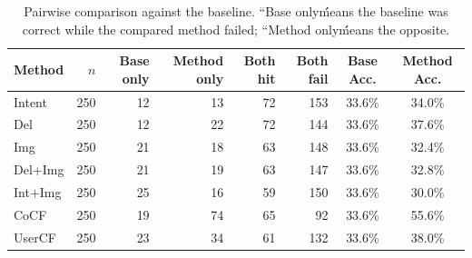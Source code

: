 \FloatBarrier



\begin{table}[t]
\centering
\small
\caption{Pairwise comparison against the baseline. ``Base only\'\' means the baseline was correct while the compared method failed; ``Method only\'\' means the opposite.}
\label{tab:pairwise-baseline}
\begin{tabular}{l r r r r r c c}
\toprule
Method & $n$ & Base only & Method only & Both hit & Both fail & Base Acc. & Method Acc. \\
\midrule
Intent & 250 & 12 & 13 & 72 & 153 & 33.6\% & 34.0\% \\
Del & 250 & 12 & 22 & 72 & 144 & 33.6\% & 37.6\% \\
Img & 250 & 21 & 18 & 63 & 148 & 33.6\% & 32.4\% \\
Del+Img & 250 & 21 & 19 & 63 & 147 & 33.6\% & 32.8\% \\
Int+Img & 250 & 25 & 16 & 59 & 150 & 33.6\% & 30.0\% \\
CoCF & 250 & 19 & 74 & 65 & 92 & 33.6\% & 55.6\% \\
UserCF & 250 & 23 & 34 & 61 & 132 & 33.6\% & 38.0\% \\
\bottomrule
\end{tabular}
\end{table}
